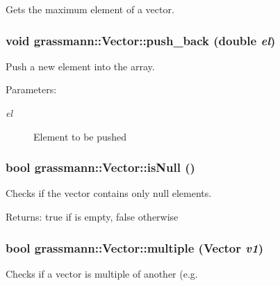 Gets the maximum element of a vector. 

\hypertarget{classgrassmann_1_1Vector_b291b7fed796d989e4448c240857cf63}{
\subsubsection[push\_\-back]{\setlength{\rightskip}{0pt plus 5cm}void grassmann::Vector::push\_\-back (double {\em el})}}
\label{classgrassmann_1_1Vector_b291b7fed796d989e4448c240857cf63}


Push a new element into the array. 

\begin{Desc}
\item[Parameters:]
\begin{description}
\item[{\em el}]Element to be pushed \end{description}
\end{Desc}
\hypertarget{classgrassmann_1_1Vector_233859ed21cd1cbba69d240de0cf2ba3}{
\subsubsection[isNull]{\setlength{\rightskip}{0pt plus 5cm}bool grassmann::Vector::isNull ()}}
\label{classgrassmann_1_1Vector_233859ed21cd1cbba69d240de0cf2ba3}


Checks if the vector contains only null elements. 

\begin{Desc}
\item[Returns:]true if is empty, false otherwise \end{Desc}
\hypertarget{classgrassmann_1_1Vector_96dd7bb0a8a2620e34b8a3ac1342deff}{
\subsubsection[multiple]{\setlength{\rightskip}{0pt plus 5cm}bool grassmann::Vector::multiple ({\bf Vector} {\em v1})}}
\label{classgrassmann_1_1Vector_96dd7bb0a8a2620e34b8a3ac1342deff}


Checks if a vector is multiple of another (e.g. 

